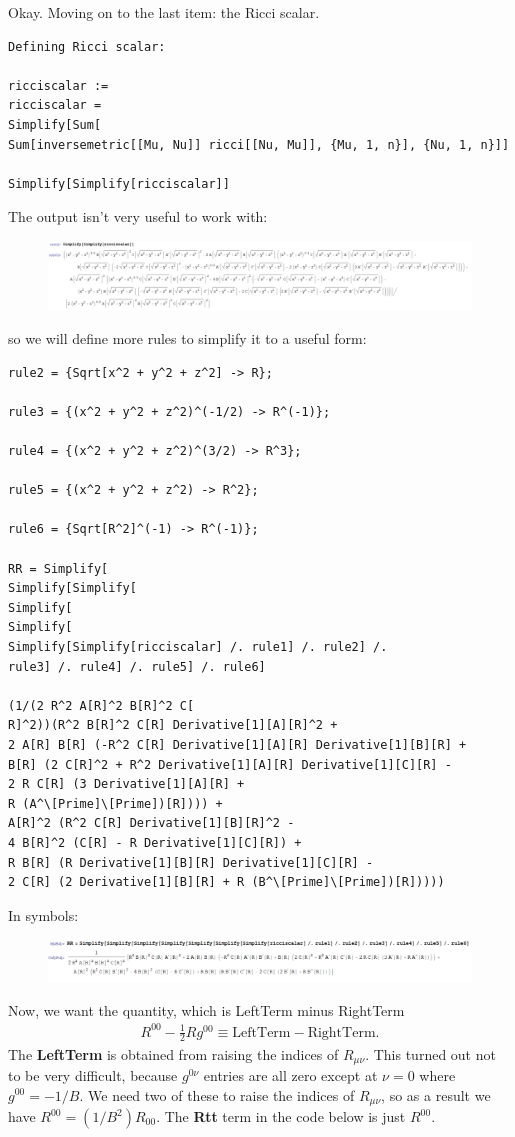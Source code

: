 \documentclass{book}
\theoremstyle{definition}
\newcommand{\f}[2]{\frac{#1}{#2}}
\begin{document}
Okay. Moving on to the last item: the Ricci scalar.
\begin{lstlisting}
Defining Ricci scalar:

ricciscalar := 
ricciscalar = 
Simplify[Sum[
Sum[inversemetric[[Mu, Nu]] ricci[[Nu, Mu]], {Mu, 1, n}], {Nu, 1, n}]]

Simplify[Simplify[ricciscalar]]
\end{lstlisting}
The output isn't very useful to work with:
\begin{figure}[!htb]
	\centering
	\includegraphics[scale=0.25]{ricciscalar}
\end{figure}
so we will define more rules to simplify it to a useful form:
\begin{lstlisting}
rule2 = {Sqrt[x^2 + y^2 + z^2] -> R};

rule3 = {(x^2 + y^2 + z^2)^(-1/2) -> R^(-1)};

rule4 = {(x^2 + y^2 + z^2)^(3/2) -> R^3};

rule5 = {(x^2 + y^2 + z^2) -> R^2};

rule6 = {Sqrt[R^2]^(-1) -> R^(-1)};

RR = Simplify[
Simplify[Simplify[
Simplify[
Simplify[
Simplify[Simplify[ricciscalar] /. rule1] /. rule2] /. 
rule3] /. rule4] /. rule5] /. rule6]

(1/(2 R^2 A[R]^2 B[R]^2 C[
R]^2))(R^2 B[R]^2 C[R] Derivative[1][A][R]^2 + 
2 A[R] B[R] (-R^2 C[R] Derivative[1][A][R] Derivative[1][B][R] + 
B[R] (2 C[R]^2 + R^2 Derivative[1][A][R] Derivative[1][C][R] - 
2 R C[R] (3 Derivative[1][A][R] + 
R (A^\[Prime]\[Prime])[R]))) + 
A[R]^2 (R^2 C[R] Derivative[1][B][R]^2 - 
4 B[R]^2 (C[R] - R Derivative[1][C][R]) + 
R B[R] (R Derivative[1][B][R] Derivative[1][C][R] - 
2 C[R] (2 Derivative[1][B][R] + R (B^\[Prime]\[Prime])[R]))))
\end{lstlisting}
In symbols:
\begin{figure}[!htb]
	\centering
	\includegraphics[scale=0.32]{ricciscalar1}
\end{figure}

Now, we want the quantity, which is LeftTerm minus RightTerm
\begin{align}
R^{00} - \f{1}{2}Rg^{00} \equiv \text{LeftTerm} - \text{RightTerm}. 
\end{align}
The \textbf{LeftTerm} is obtained from raising the indices of $R_{\mu\nu}$. This turned out not to be very difficult, because $g^{0\nu}$ entries are all zero except at $\nu = 0$ where $g^{00} = -1/B$. We need two of these to raise the indices of $R_{\mu\nu}$, so as a result we have $R^{00} = (1/B^2)R_{00}$. The \textbf{Rtt} term in the code below is just $R^{00}$.
\end{document}
